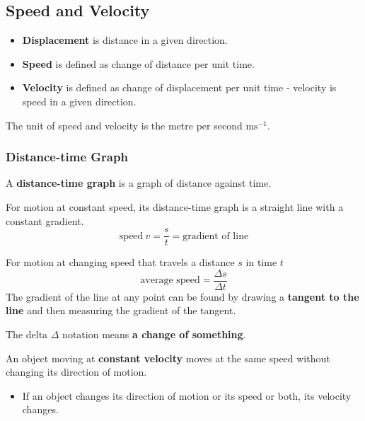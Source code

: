 \subsection{Speed and Velocity}
\begin{itemize}
    \item \textbf{Displacement} is distance in a given direction.
    \item \textbf{Speed} is defined as change of distance per unit time.
    \item \textbf{Velocity} is defined as change of displacement per unit time - velocity is speed in a given direction.
\end{itemize}

The unit of speed and velocity is the metre per second $\text{ms}^{-1}$.

\subsubsection*{Distance-time Graph}

A \textbf{distance-time graph} is a graph of distance against time.

For motion at constant speed, its distance-time graph is a straight line with a constant gradient.
$$\text{speed}\ v=\frac{s}{t}=\text{gradient of line}$$

For motion at changing speed that travels a distance $s$ in time $t$
$$\text{average speed}=\frac{\Delta s}{\Delta t}$$
The gradient of the line at any point can be found by drawing a \textbf{tangent to the line} and then measuring the gradient of the tangent.

The delta $\Delta$ notation means \textbf{a change of something}.

An object moving at \textbf{constant velocity} moves at the same speed without changing its direction of motion.
\begin{itemize}
    \item If an object changes its direction of motion or its speed or both, its velocity changes.
\end{itemize}
